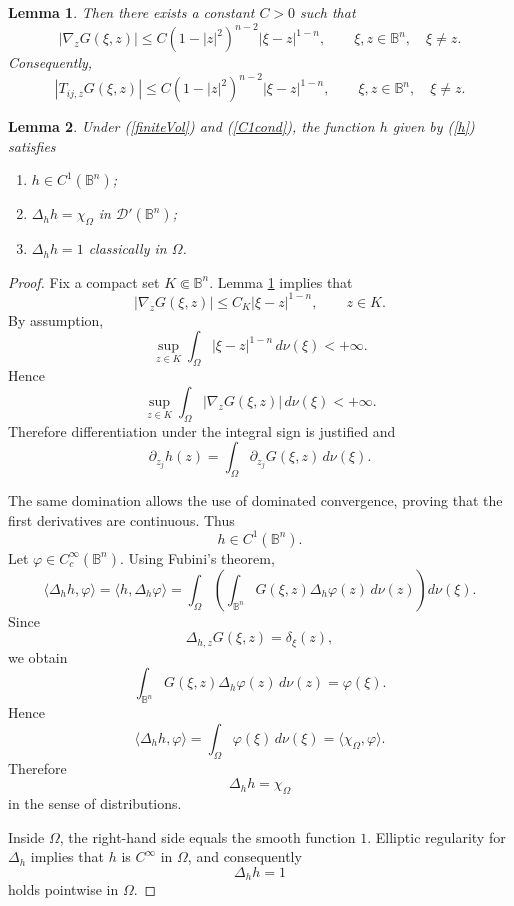 \documentclass[10pt,a4paper]{amsart}
\newtheorem{lemma}{Lemma}
\newcommand{\Bn}{\mathbb B^n}
\begin{document}
\begin{lemma}\label{gradient}
 Then there exists a constant \(C>0\) such that
\[
|\nabla_zG(\xi,z)|
\le
C(1-|z|^2)^{n-2}|\xi-z|^{1-n},
\qquad
\xi,z\in\Bn,\quad \xi\ne z.
\]
Consequently,
\[
|T_{ij,z}G(\xi,z)|
\le
C(1-|z|^2)^{n-2}|\xi-z|^{1-n},
\qquad
\xi,z\in\Bn,\quad \xi\ne z.
\]
\end{lemma}

\begin{lemma}\label{Regularity} Under (\ref{finiteVol}) and (\ref{C1cond}), the function $h$ given by (\ref{h})
satisfies
\begin{enumerate}
\item \(h\in C^1(\Bn)\);
\item \(\Delta_h h=\chi_\Omega\) in \(\mathcal D'(\Bn)\);
\item \(\Delta_h h=1\) classically in \(\Omega\).
\end{enumerate}
\end{lemma}

\begin{proof} 
Fix a compact set \(K\Subset\Bn\). Lemma \ref{gradient} implies that
\[
|\nabla_zG(\xi,z)|
\le C_K |\xi-z|^{1-n},
\qquad z\in K.
\]
By assumption,
\[
\sup_{z\in K}
\int_\Omega |\xi-z|^{1-n}\,d\nu(\xi)<+\infty.
\]
Hence
\[
\sup_{z\in K}
\int_\Omega |\nabla_zG(\xi,z)|\,d\nu(\xi)<+\infty.
\]
Therefore differentiation under the integral sign is justified and
\[
\partial_{z_j}h(z)
=
\int_\Omega \partial_{z_j}G(\xi,z)\,d\nu(\xi).
\]

The same domination allows the use of dominated convergence, proving that the
first derivatives are continuous. Thus
\[
h\in C^1(\Bn).
\]
Let \(\varphi\in C_c^\infty(\mathbb B^n)\). Using Fubini's theorem,
\[
\langle \Delta_h h,\varphi\rangle
=
\langle h,\Delta_h\varphi\rangle
=
\int_\Omega
\left(
\int_{\Bn}
G(\xi,z)\Delta_h\varphi(z)\,d\nu(z)
\right)
d\nu(\xi).
\]
Since
\[
\Delta_{h,z}G(\xi,z)=\delta_\xi(z),
\]
we obtain
\[
\int_{\Bn}
G(\xi,z)\Delta_h\varphi(z)\,d\nu(z)
=
\varphi(\xi).
\]
Hence
\[
\langle \Delta_h h,\varphi\rangle
=
\int_\Omega \varphi(\xi)\,d\nu(\xi)
=
\langle \chi_\Omega,\varphi\rangle.
\]
Therefore
\[
\Delta_h h=\chi_\Omega
\]
in the sense of distributions.

Inside \(\Omega\), the right-hand side equals the smooth function \(1\).
Elliptic regularity for \(\Delta_h\) implies that \(h\) is \(C^\infty\) in
\(\Omega\), and consequently
\[
\Delta_h h=1
\]
holds pointwise in \(\Omega\).
\end{proof}
\end{document}
